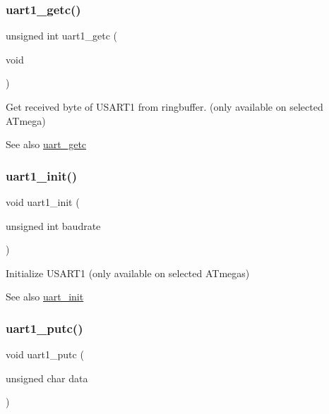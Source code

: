 \subsubsection{\texorpdfstring{uart1\+\_\+getc()}{uart1\_getc()}}
{\footnotesize\ttfamily unsigned int uart1\+\_\+getc (\begin{DoxyParamCaption}\item[{void}]{ }\end{DoxyParamCaption})}



Get received byte of U\+S\+A\+R\+T1 from ringbuffer. (only available on selected A\+Tmega) 

\begin{DoxySeeAlso}{See also}
\hyperlink{group__pfleury__uart_gaefaab30a8338ec46a6be35b99b1b4f09}{uart\+\_\+getc} 
\end{DoxySeeAlso}
\mbox{\label{group__pfleury__uart_ga4db697cb5469fd70e794fa7df73a6d6a}} 
\subsubsection{\texorpdfstring{uart1\+\_\+init()}{uart1\_init()}}
{\footnotesize\ttfamily void uart1\+\_\+init (\begin{DoxyParamCaption}\item[{unsigned int}]{baudrate }\end{DoxyParamCaption})}



Initialize U\+S\+A\+R\+T1 (only available on selected A\+Tmegas) 

\begin{DoxySeeAlso}{See also}
\hyperlink{group__pfleury__uart_gac19a76bb7d446125734a67f9f4b68991}{uart\+\_\+init} 
\end{DoxySeeAlso}
\mbox{\label{group__pfleury__uart_gab465f689d197fadfbacc374fc9411154}} 
\subsubsection{\texorpdfstring{uart1\+\_\+putc()}{uart1\_putc()}}
{\footnotesize\ttfamily void uart1\+\_\+putc (\begin{DoxyParamCaption}\item[{unsigned char}]{data }\end{DoxyParamCaption})}



